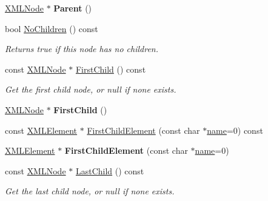 \begin{DoxyCompactItemize}
\hyperlink{classtinyxml2_1_1_x_m_l_node}{X\+M\+L\+Node} $\ast$ {\bfseries Parent} ()
\item 
\mbox{\label{classtinyxml2_1_1_x_m_l_node_ac3ab489e6e202a3cd1762d3b332e89d4}} 
bool \hyperlink{classtinyxml2_1_1_x_m_l_node_ac3ab489e6e202a3cd1762d3b332e89d4}{No\+Children} () const
\begin{DoxyCompactList}\small\item\em Returns true if this node has no children. \end{DoxyCompactList}\item 
\mbox{\label{classtinyxml2_1_1_x_m_l_node_ae7dc225e1018cdd685f7563593a1fe08}} 
const \hyperlink{classtinyxml2_1_1_x_m_l_node}{X\+M\+L\+Node} $\ast$ \hyperlink{classtinyxml2_1_1_x_m_l_node_ae7dc225e1018cdd685f7563593a1fe08}{First\+Child} () const
\begin{DoxyCompactList}\small\item\em Get the first child node, or null if none exists. \end{DoxyCompactList}\item 
\mbox{\label{classtinyxml2_1_1_x_m_l_node_a2d6c70c475146b48bc93a7fafdeff5e0}} 
\hyperlink{classtinyxml2_1_1_x_m_l_node}{X\+M\+L\+Node} $\ast$ {\bfseries First\+Child} ()
\item 
const \hyperlink{classtinyxml2_1_1_x_m_l_element}{X\+M\+L\+Element} $\ast$ \hyperlink{classtinyxml2_1_1_x_m_l_node_a1bec132dcf085284e0a10755f2cf0d57}{First\+Child\+Element} (const char $\ast$\hyperlink{structname}{name}=0) const
\item 
\mbox{\label{classtinyxml2_1_1_x_m_l_node_af1e0e475cc27d5e7eeaf4d732691b741}} 
\hyperlink{classtinyxml2_1_1_x_m_l_element}{X\+M\+L\+Element} $\ast$ {\bfseries First\+Child\+Element} (const char $\ast$\hyperlink{structname}{name}=0)
\item 
\mbox{\label{classtinyxml2_1_1_x_m_l_node_a9b8583a277e8e26f4cbbb5492786778e}} 
const \hyperlink{classtinyxml2_1_1_x_m_l_node}{X\+M\+L\+Node} $\ast$ \hyperlink{classtinyxml2_1_1_x_m_l_node_a9b8583a277e8e26f4cbbb5492786778e}{Last\+Child} () const
\begin{DoxyCompactList}\small\item\em Get the last child node, or null if none exists. \end{DoxyCompactList}\item 

\end{DoxyCompactItemize}
